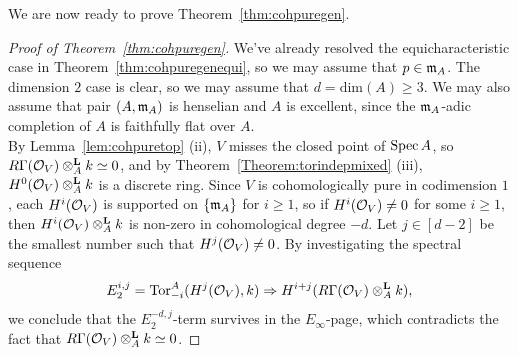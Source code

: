 We are now ready to prove Theorem~\ref{thm:cohpuregen}.
\begin{proof}[Proof of Theorem~\ref{thm:cohpuregen}]
We've already resolved the equicharacteristic case in Theorem~\ref{thm:cohpuregenequi}, so we may assume 
that $p \in \ideal{m}_A$. The dimension $2$ case is clear, so we may assume that $d=\mathrm{dim}(A) \ge 3$. 
We may also assume that pair $(A, \ideal{m}_A)$ is henselian and $A$ is excellent, since the $\ideal{m}_A$-adic completion of $A$ is faithfully flat over $A$.\\
\indent By Lemma~\ref{lem:cohpuretop} (ii), 
$V$ misses the closed point of $\spec{A}$, so $R\Gamma(\cal{O}_V) \otimesl_A k \simeq 0$, and by Theorem~\ref{Theorem:torindepmixed} (iii), $H^0(\cal{O}_V) \otimesl_A k$ is a discrete ring. 
Since $V$ is cohomologically pure in codimension $1$, each $H^i(\cal{O}_V)$ is supported on $\{\ideal{m}_A\}$ for $i \ge 1$, 
so if $H^i(\cal{O}_V) \neq 0$ for some $i \ge 1$, then $H^i(\cal{O}_V) \otimesl_A k$ is non-zero in cohomological degree $-d$.
Let $j\in [d-2]$ be the smallest number such that $H^j(\cal{O}_V) \neq 0$. By investigating the spectral sequence
\[E_2^{i,j} = \mathrm{Tor}_{-i}^A(H^{j}(\cal{O}_V), k) \Rightarrow H^{i+j}(R\Gamma(\cal{O}_V) \otimesl_A k),\]
we conclude that the $E_2^{-d,j}$-term survives in the $E_{\infty}$-page, which contradicts the fact that $R\Gamma(\cal{O}_V) \otimesl_A k \simeq 0$.
\end{proof}
